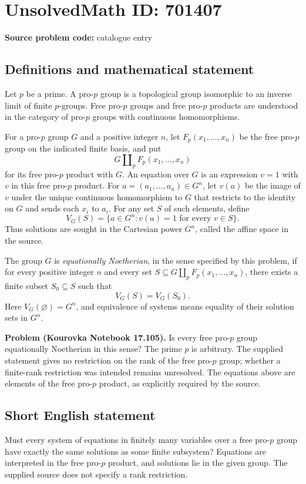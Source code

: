 \documentclass[11pt]{article}
\begin{document}
\section*{UnsolvedMath ID: 701407}
\textbf{Source problem code:} catalogue entry
\subsection{Definitions and mathematical statement}
Let \(p\) be a prime. A pro-\(p\) group is a topological group isomorphic to an inverse limit of finite \(p\)-groups. Free pro-\(p\) groups and free pro-\(p\) products are understood in the category of pro-\(p\) groups with continuous homomorphisms.

For a pro-\(p\) group \(G\) and a positive integer \(n\), let \(F_p(x_1,\ldots,x_n)\) be the free pro-\(p\) group on the indicated finite basis, and put
\[
G\amalg_p F_p(x_1,\ldots,x_n)
\]
for its free pro-\(p\) product with \(G\). An equation over \(G\) is an expression \(v=1\) with \(v\) in this free pro-\(p\) product. For \(a=(a_1,\ldots,a_n)\in G^n\), let \(v(a)\) be the image of \(v\) under the unique continuous homomorphism to \(G\) that restricts to the identity on \(G\) and sends each \(x_i\) to \(a_i\). For any set \(S\) of such elements, define
\[
V_G(S)=\{a\in G^n: v(a)=1\text{ for every }v\in S\}.
\]
Thus solutions are sought in the Cartesian power \(G^n\), called the affine space in the source.

The group \(G\) is \emph{equationally Noetherian}, in the sense specified by this problem, if for every positive integer \(n\) and every set
\(S\subseteq G\amalg_p F_p(x_1,\ldots,x_n)\), there exists a finite subset \(S_0\subseteq S\) such that
\[
V_G(S)=V_G(S_0).
\]
Here \(V_G(\varnothing)=G^n\), and equivalence of systems means equality of their solution sets in \(G^n\).

\textbf{Problem (Kourovka Notebook 17.105).} Is every free pro-\(p\) group equationally Noetherian in this sense? The prime \(p\) is arbitrary. The supplied statement gives no restriction on the rank of the free pro-\(p\) group; whether a finite-rank restriction was intended remains unresolved. The equations above are elements of the free pro-\(p\) product, as explicitly required by the source.
\subsection{Short English statement}
Must every system of equations in finitely many variables over a free pro-\(p\) group have exactly the same solutions as some finite subsystem? Equations are interpreted in the free pro-\(p\) product, and solutions lie in the given group. The supplied source does not specify a rank restriction.
\end{document}
